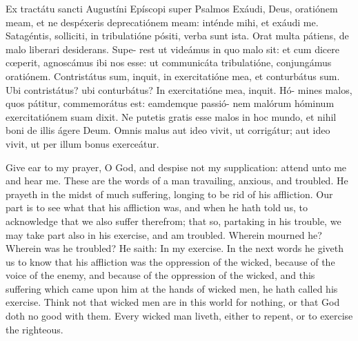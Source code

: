 Ex tractátu sancti Augustíni Epíscopi super Psalmos
Exáudi, Deus, oratiónem meam, et ne despéxeris deprecatiónem meam:
inténde mihi, et exáudi me. Satagéntis, solliciti, in tribulatióne pósiti,
verba sunt ista. Orat multa pátiens, de malo liberari desiderans. Supe-
rest ut videámus in quo malo sit: et cum dicere cœperit, agnoscámus
ibi nos esse: ut communicáta tribulatióne, conjungámus oratiónem.
Contristátus sum, inquit, in exercitatióne mea, et conturbátus sum.
Ubi contristátus? ubi conturbátus? In exercitatióne mea, inquit. Hó-
mines malos, quos pátitur, commemorátus est: eamdemque passió-
nem malórum hóminum exercitatiónem suam dixit. Ne putetis gratis
esse malos in hoc mundo, et nihil boni de illis ágere Deum. Omnis
malus aut ideo vivit, ut corrigátur; aut ideo vivit, ut per illum bonus
exerceátur.

Give ear to my prayer, O God, and despise not my supplication: 
attend unto me and hear me. These are the words of a man travailing, anxious, and troubled. 
He prayeth in the midst of much suffering, longing to be rid of his affliction. 
Our part is to see what that his affliction was, and when he hath told us, 
to acknowledge that we also suffer therefrom; 
that so, partaking in his trouble, we may take part also in his exercise, 
and am troubled. Wherein mourned he? Wherein was he troubled? He saith: 
In my exercise. In the next words he giveth us to know that his affliction was the oppression of the wicked, 
because of the voice of the enemy, and because of the oppression of the wicked, and this suffering which came upon him at the hands of wicked men, he hath called his exercise. Think not that wicked men are in this world for nothing, or that God doth no good with them. Every wicked man liveth, either to repent, or to exercise the righteous.